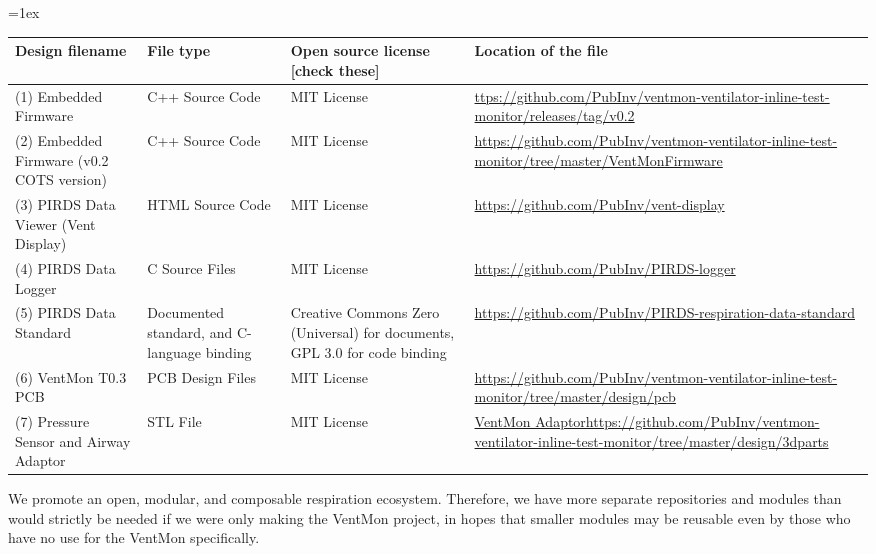 \documentclass[11pt, letterpaper]{article}
\begin{document}
\tabulinesep=1ex
\begin{tabu} to \linewidth {|X|X|X[1.5,1]|X[1.5,1]|}
\hline
\textbf{Design filename} & \textbf{File type} & \textbf{Open source license [check these]} & \textbf{Location of the file} \\\hline
(1) Embedded Firmware & C++ Source Code & MIT License &  \href{ttps://github.com/PubInv/ventmon-ventilator-inline-test-monitor/releases/tag/v0.2}{ttps://github.com/PubInv/ventmon-ventilator-inline-test-monitor/releases/tag/v0.2}\\\hline
(2) Embedded Firmware (v0.2 COTS version) & C++ Source Code & MIT License &  \href{https://github.com/PubInv/ventmon-ventilator-inline-test-monitor/tree/master/VentMonFirmware}{https://github.com/PubInv/ventmon-ventilator-inline-test-monitor/tree/master/VentMonFirmware}\\\hline
(3) PIRDS Data Viewer (Vent Display) & HTML Source Code &  MIT License &  \href{https://github.com/PubInv/vent-display}{https://github.com/PubInv/vent-display} \\\hline
(4) PIRDS Data Logger & C Source Files & MIT License & \href{https://github.com/PubInv/PIRDS-logger}{https://github.com/PubInv/PIRDS-logger} \\\hline
(5) PIRDS Data Standard & Documented standard, and C-language binding & Creative Commons Zero (Universal) for documents, GPL 3.0 for code binding &
\href{https://github.com/PubInv/PIRDS-respiration-data-standard}{https://github.com/PubInv/PIRDS-respiration-data-standard} \\\hline
(6) VentMon T0.3 PCB & PCB Design Files & MIT License & \href{https://github.com/PubInv/ventmon-ventilator-inline-test-monitor/tree/master/design/pcb}{https://github.com/PubInv/ventmon-ventilator-inline-test-monitor/tree/master/design/pcb} \\\hline
(7) Pressure Sensor and Airway Adaptor & STL File & MIT License &  \href{https://github.com/PubInv/ventmon-ventilator-inline-test-monitor/tree/master/design/3dparts}{VentMon Adaptorhttps://github.com/PubInv/ventmon-ventilator-inline-test-monitor/tree/master/design/3dparts}\\\hline


\end{tabu}

We promote an open, modular, and composable respiration ecosystem. Therefore, we have more separate repositories and modules than would strictly be needed if we were only making the VentMon project,
in hopes that smaller modules may be reusable even by those who have no use for the VentMon specifically.
\end{document}
